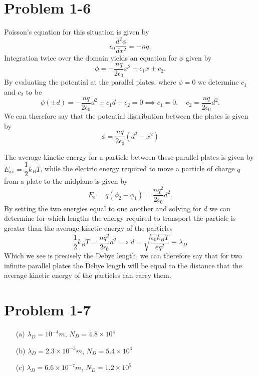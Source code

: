 \section*{Problem 1-6}
\label{sec:1-6}
Poisson's equation for this situation is given by
\begin{equation}
	\epsilon_0\dfrac{d^2\phi}{dx^2} = -nq.
\end{equation}
Integration twice over the domain yields an equation for \(\phi \) given by
\begin{equation}
	\phi = -\dfrac{nq}{2\epsilon_0}x^2 + c_1x + c_2.
\end{equation}
By evaluating the potential at the parallel plates, where \(\phi=0\) we determine \(c_1\) and \(c_2\) to be
\begin{equation}
	\phi(\pm d) = -\dfrac{nq}{2\epsilon_0}d^2 \pm c_1d + c_2 = 0 \implies
	c_1 = 0, \quad c_2 = \dfrac{nq}{2\epsilon_0}d^2.
\end{equation}
We can therefore say that the potential distribution between the plates is given by
\begin{equation}
	\phi = \dfrac{nq}{2\epsilon_0}\left(d^2 - x^2\right)
\end{equation}

The average kinetic energy for a particle between these parallel plates is given by \(E_\text{av} = \dfrac{1}{2}k_BT\), while the electric energy required to move a particle of charge \(q\) from a plate to the midplane is given by
\begin{equation}
	E_\text{e} = q\left(\phi_2 - \phi_1\right) = \dfrac{nq^2}{2\epsilon_0}d^2.
\end{equation}
By setting the two energies equal to one another and solving for \(d\) we can determine for which lengths the energy required to transport the particle is greater than the average kinetic energy of the particles
\begin{equation}
	\dfrac{1}{2}k_BT = \dfrac{nq^2}{2\epsilon_0}d^2 \implies d = \sqrt{\dfrac{\epsilon_0k_BT}{eq^2}} \equiv \lambda_D
\end{equation}
Which we see is precisely the Debye length, we can therefore say that for two infinite parallel plates the Debye length will be equal to the distance that the average kinetic energy of the particles can carry them. 

\section*{Problem 1-7}
\label{sec:1-7}
\begin{itemize}
	\item[(a)] \(\lambda_D = 10^{-4}m \), \(N_D = 4.8\times10^4 \)
	\item[(b)] \(\lambda_D = 2.3\times10^{-3}m \), \(N_D = 5.4\times10^{4}\)
	\item[(c)] \(\lambda_D = 6.6\times10^{-7}m \), \(N_D = 1.2\times10^5\)
\end{itemize}

